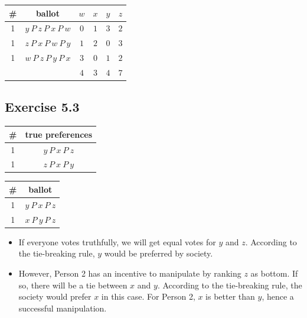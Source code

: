 \documentclass[a4paper]{article}
\begin{document}
\begin{table}[!htbp]
    \centering
    \begin{tabular}{c|c|cccc|}
        \# & ballot                       & $w$  & $x$  & $y$  & $z$ \\ 
        \hline
        1  & $y\: P\: z\: P\: x\: P\: w$  & $0$  & $1$  & $3$  & $2$ \\
        1  & $z\: P\: x\: P\: w\: P\: y$  & $1$  & $2$  & $0$  & $3$ \\
        1  & $w\: P\: z\: P\: y\: P\: x$  & $3$  & $0$  & $1$  & $2$ \\
        \hline
           &                              & $4$ & $3$  & $4$  & $7$ \\
        \hline
    \end{tabular}
\end{table}

\subsection*{Exercise 5.3}

\begin{table}[!htbp]
    \centering
    \begin{tabular}{c|c|}
        \# & true preferences         \\ 
        \hline
        1  & $y\: P\: x\: P\: z$ \\
        1  & $z\: P\: x\: P\: y$ \\
        \hline
    \end{tabular}
\end{table}

\begin{table}[!htbp]
    \centering
    \begin{tabular}{c|c|}
        \# & ballot              \\ 
        \hline
        1  & $y\: P\: x\: P\: z$ \\
        1  & $x\: P\: y\: P\: z$ \\
        \hline
    \end{tabular}
\end{table}

\begin{itemize}
    \item If everyone votes truthfully, we will get equal votes for $y$ and $z$. According to the tie-breaking rule, $y$ would be preferred by society. 
    \item However, Person 2 has an incentive to manipulate by ranking $z$ as bottom. If so, there will be a tie between $x$ and $y$. According to the tie-breaking rule, the society would prefer $x$ in this case. For Person 2, $x$ is better than $y$, hence a successful manipulation.
\end{itemize}
\end{document}
